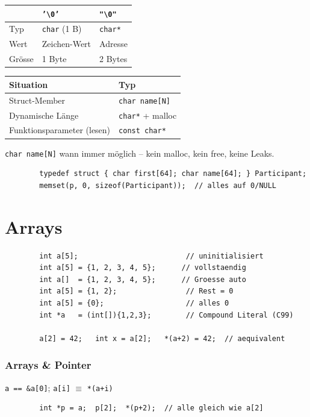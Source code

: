 \documentclass[a4paper,9pt]{article}
\begin{document}
	\begin{center}
		\begin{tabular}{lll}
			\toprule
			& \texttt{'\textbackslash0'} & \texttt{"\textbackslash0"} \\
			\midrule
			Typ    & \texttt{char} (1 B)  & \texttt{char*} \\
			Wert   & Zeichen-Wert         & Adresse \\
			Grösse & 1 Byte               & 2 Bytes \\
			\bottomrule
		\end{tabular}
	\end{center}
	
	\begin{tabular}{ll}
		\toprule
		Situation & Typ \\
		\midrule
		Struct-Member              & \texttt{char name[N]} \\
		Dynamische Länge           & \texttt{char*} + malloc \\
		Funktionsparameter (lesen) & \texttt{const char*} \\
		\bottomrule
	\end{tabular}
	
	\begin{tcolorbox}
		\texttt{char name[N]} wann immer möglich -- kein malloc, kein free, keine Leaks.
	\end{tcolorbox}
	
	\begin{lstlisting}
		typedef struct { char first[64]; char name[64]; } Participant;
		memset(p, 0, sizeof(Participant));  // alles auf 0/NULL
	\end{lstlisting}
	
	\section{Arrays}
	\begin{lstlisting}
		int a[5];                         // uninitialisiert
		int a[5] = {1, 2, 3, 4, 5};      // vollstaendig
		int a[]  = {1, 2, 3, 4, 5};      // Groesse auto
		int a[5] = {1, 2};                // Rest = 0
		int a[5] = {0};                   // alles 0
		int *a   = (int[]){1,2,3};        // Compound Literal (C99)
		
		a[2] = 42;   int x = a[2];   *(a+2) = 42;  // aequivalent
	\end{lstlisting}
	
	\subsubsection{Arrays \& Pointer}
	\texttt{a == \&a[0]}; \texttt{a[i]} $\equiv$ \texttt{*(a+i)}
	\begin{lstlisting}
		int *p = a;  p[2];  *(p+2);  // alle gleich wie a[2]
	\end{lstlisting}
	
\end{document}
